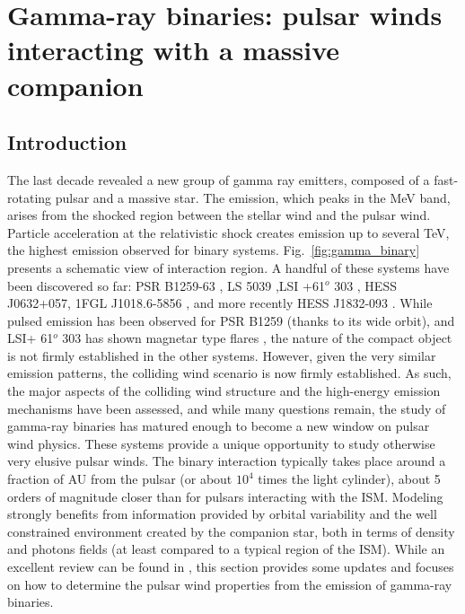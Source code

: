 \section{Gamma-ray binaries: pulsar winds interacting with a massive companion}
\label{sec:binaries}
\subsection{Introduction}
The last decade revealed a new group of gamma ray emitters, composed of a fast-rotating pulsar and a massive star. The emission, which peaks in the MeV band, arises from the shocked region between the stellar wind and the pulsar wind. Particle acceleration at the relativistic shock creates emission up to several TeV, the highest emission observed for binary systems. Fig.~\ref{fig:gamma_binary} presents a schematic view of interaction region. A handful of these systems have been discovered so far: PSR B1259-63 \citep{2005A&A...442....1A}, LS 5039 \citep{2005Sci...309..746A} ,LSI +61$^o$ 303 \citep{2006Sci...312.1771A}, HESS J0632+057\citep{2011ApJ...737L..11B}, 1FGL J1018.6-5856 \citep{2010ApJS..188..405A}, and more recently HESS J1832-093 \citep{2016MNRAS.457.1753E}. While pulsed emission has been observed for PSR B1259 (thanks to its wide orbit), and LSI+ 61$^o$ 303 has shown magnetar type flares {\cred \citep{ATEL}}, the nature of the compact object is not firmly established in the other systems. However, given the very similar emission patterns, the colliding wind scenario is now firmly established. As such, the major aspects of the colliding wind structure and the high-energy emission mechanisms have been assessed, and while many questions remain, the study of  gamma-ray binaries has matured enough to become a new window on pulsar wind physics.  These systems provide a unique opportunity to study otherwise very elusive pulsar winds. The binary interaction typically takes place around a fraction of  AU from the pulsar (or about $10^4$ times the light cylinder), about 5 orders of magnitude closer than for pulsars interacting with the ISM.  Modeling strongly benefits from information provided by orbital variability and  the well constrained environment created by the companion star, both in terms of density and photons fields (at least compared to a typical region of the ISM).  While an excellent review can be found in \citep{2013A&ARv..21...64D}, this section provides some updates and focuses on how to determine the pulsar wind properties from the emission of gamma-ray binaries.

